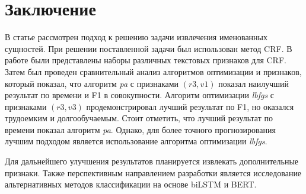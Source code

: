 \documentclass{csmathnotes}
\begin{document}
\section*{Заключение}
В статье рассмотрен подход к решению задачи извлечения именованных сущностей. При решении поставленной задачи был использован метод CRF. В работе были представлены наборы различных текстовых признаков для CRF. 
Затем был проведен сравнительный анализ алгоритмов оптимизации и признаков, который показал, что алгоритм \emph{pa} с признаками $(r3, v1)$ показал наилучший результат по времени и F1 в совокупности. Алгоритм оптимизации \emph{lbfgs}  с признаками $(r3, v3)$ продемонстрировал лучший результат по F1, но оказался трудоемким и долгообучаемым. Стоит отметить, что лучший результат  по времени показал алгоритм \emph{pa}. Однако, для более точного прогнозирования лучшим подходом является использование алгоритма оптимизации \emph{lbfgs}.


Для дальнейшего улучшения результатов планируется извлекать дополнительные признаки. Также перспективным направлением разработки является исследование альтернативных методов классификации на основе biLSTM и BERT.

\printbibliography
\end{document}
